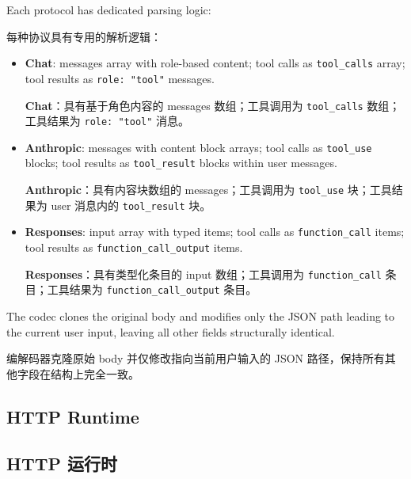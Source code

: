 Each protocol has dedicated parsing logic:
\begin{chinese}
每种协议具有专用的解析逻辑：
\end{chinese}
\begin{itemize}[nosep]
    \item \textbf{Chat}: messages array with role-based content; tool calls as \texttt{tool\_calls} array; tool results as \texttt{role: "tool"} messages.
    \begin{chinese}
    \textbf{Chat}：具有基于角色内容的 messages 数组；工具调用为 \texttt{tool\_calls} 数组；工具结果为 \texttt{role: "tool"} 消息。
    \end{chinese}
    \item \textbf{Anthropic}: messages with content block arrays; tool calls as \texttt{tool\_use} blocks; tool results as \texttt{tool\_result} blocks within user messages.
    \begin{chinese}
    \textbf{Anthropic}：具有内容块数组的 messages；工具调用为 \texttt{tool\_use} 块；工具结果为 user 消息内的 \texttt{tool\_result} 块。
    \end{chinese}
    \item \textbf{Responses}: input array with typed items; tool calls as \texttt{function\_call} items; tool results as \texttt{function\_call\_output} items.
    \begin{chinese}
    \textbf{Responses}：具有类型化条目的 input 数组；工具调用为 \texttt{function\_call} 条目；工具结果为 \texttt{function\_call\_output} 条目。
    \end{chinese}
\end{itemize}

The codec clones the original body and modifies only the JSON path leading to the current user input, leaving all other fields structurally identical.
\begin{chinese}
编解码器克隆原始 body 并仅修改指向当前用户输入的 JSON 路径，保持所有其他字段在结构上完全一致。
\end{chinese}

\subsection{HTTP Runtime}
\begin{chinese}
\subsection{HTTP 运行时}
\end{chinese}

